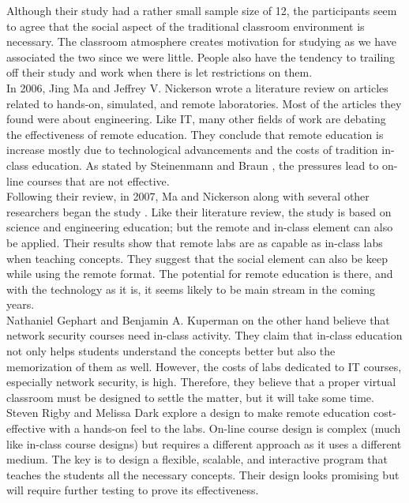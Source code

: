 \documentclass[titlepage]{article}
\begin{document}
\noindent Although their study had a rather small sample size of 12, the participants seem to agree that
the social aspect of the traditional classroom environment is necessary.  The classroom
atmosphere creates motivation for studying as we have associated the two since we were
little.  People also have the tendency to trailing off their study and work when there is
let restrictions on them.\\

\noindent In 2006, Jing Ma and Jeffrey V. Nickerson \citep{2} wrote a literature review on articles
related to hands-on, simulated, and remote laboratories.  Most of the articles they found were about
engineering.  Like IT, many other fields of work are debating the effectiveness of remote education.
They conclude that remote education is increase mostly due to technological advancements and the
costs of tradition in-class education.  As stated by Steinenmann and Braun \citep{1}, the pressures
lead to on-line courses that are not effective.\\

\noindent Following their review, in 2007, Ma and Nickerson along with several other
researchers began the study \citep{3}.  Like their literature review, the study is based on science and
engineering education; but the remote and in-class element can also be applied.  Their results show that
remote labs are as capable as in-class labs when teaching concepts.  They suggest that the social
element can also be keep while using the remote format.  The potential for remote education is there,
and with the technology as it is, it seems likely to be main stream in the coming years.\\

\noindent Nathaniel Gephart and Benjamin A. Kuperman \citep{4} on the other hand believe that
network security courses need in-class activity.  They claim that in-class education not only helps
students understand the concepts better but also the memorization of them as well.  However, the
costs of labs dedicated to IT courses, especially network security, is high.  Therefore, they believe
that a proper virtual classroom must be designed to settle the matter, but it will take some time.\\

\noindent Steven Rigby and Melissa Dark \citep{5} explore a design to make remote education
cost-effective with a hands-on feel to the labs.  On-line course design is complex (much like
in-class course designs) but requires a different approach as it uses a different medium.  The
key is to design a flexible, scalable, and interactive program that teaches the students all the
necessary concepts.  Their design looks promising but will require further testing to prove
its effectiveness.\\
\end{document}

